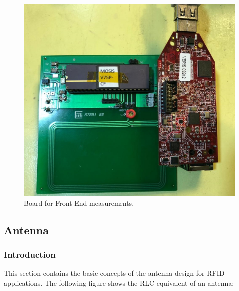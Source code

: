 \documentclass[a4paper, 10pt, conference]{ieeeconf}      %
\begin{document}
\begin{figure}[H]
\centering
\includegraphics[scale=0.2]{Images/ImagenesTesina/500nm_Test_Shield.jpg}
\caption{Board for Front-End measurements.}
\label{fig:500nm_test_placa}
\end{figure}

\subsection{Antenna}
\subsubsection{Introduction}
This section contains the basic concepts of the antenna design for RFID applications. The following figure shows the RLC equivalent of an antenna:

\end{document}
